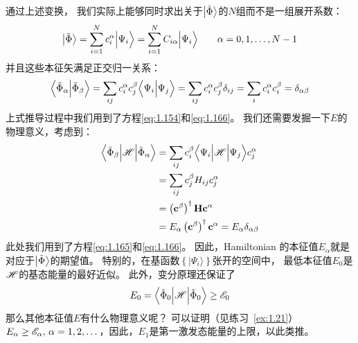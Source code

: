 通过上述变换，
我们实际上能够同时求出关于$\Ket{\tilde\Phi}$的$N$组而不是一组展开系数：
\begin{equation}
 \Ket{\tilde\Phi} = \sum_{i=1}^N c_i^\alpha \Big\vert\Psi_i\Big\rangle = \sum_{i=1}^N C_{i\alpha}\Big\vert\Psi_i\Big\rangle \qquad \alpha = 0, 1, \dots, N-1
 \label{eq:1.168}
\end{equation}
并且这些本征矢满足正交归一关系：
\begin{equation}
 \Big\langle\tilde\Phi_\alpha\Big\vert\tilde\Phi_\beta\Big\rangle = \sum_{ij} c_i^\alpha c_j^\beta \Big\langle\Psi_i\Big\vert\Psi_j\Big\rangle = \sum_{ij}c_i^\alpha c_j^\beta\delta_{ij} = \sum_i c_i^\alpha c_i^\beta = \delta_{\alpha\beta}
 \label{eq:1.169}
\end{equation}
上式推导过程中我们用到了方程\eqref{eq:1.154}和\eqref{eq:1.166}。
我们还需要发掘一下$E$的物理意义，考虑到：
\begin{equation}
 \begin{split}
     \Big\langle\tilde\Phi_\beta\Big\vert\mathscr{H}\Big\vert\tilde\Phi_\alpha\Big\rangle &= \sum_{ij} c_i^\beta \Big\langle \Psi_i\Big\vert\mathscr{H}\Big\vert\Psi_j\Big\rangle c_j^\alpha \\
     &= \sum_{ij}c_j^\beta H_{ij}c_j^\alpha \\
     &= \left(\mathbf{c}^\beta\right)^\dagger\mathbf{H}\mathbf{c}^\alpha \\
     &= E_\alpha \left(\mathbf{c}^\beta\right)^\dagger\mathbf{c}^\alpha = E_\alpha \delta_{\alpha\beta}
 \end{split}
 \label{eq:1.170}
\end{equation}
此处我们用到了方程\eqref{eq:1.165}和\eqref{eq:1.166}。
因此，Hamiltonian 的本征值$E_\alpha$就是 对应于$\Ket{\tilde\Phi}$的期望值。
特别的，在基函数$\left\{\vert\Psi_i\rangle\right\}$张开的空间中，
最低本征值$E_0$是$\mathscr{H}$的基态能量的最好近似。
此外，变分原理还保证了
\begin{equation}
 E_0 = \Big\langle\tilde\Phi_0\Big\vert\mathscr{H}\Big\vert\tilde\Phi_0\Big\rangle \geq \mathscr{E}_0
 \label{eq:1.171}
\end{equation}
那么其他本征值$E$有什么物理意义呢？
可以证明（见练习~\ref{ex:1.21}）
$E_\alpha \geq \mathscr{E}_\alpha,\, \alpha = 1, 2, \dots$，因此，$E_1$是第一激发态能量的上限，以此类推。

